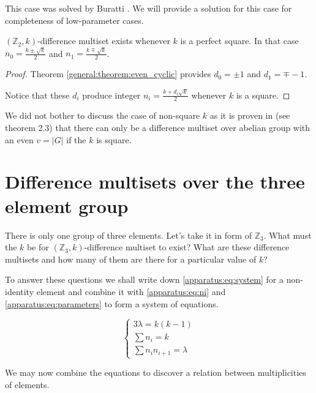     This case was solved by Buratti \cite{buratti1999old}. We will provide a solution for this case for completeness of low-parameter cases.
    
    \begin{theorem}
        $(\mathbb Z_2,k)$-difference multiset exists whenever $k$ is a perfect square. In that case $n_0 = \frac{k \pm \sqrt k}{2}$ and $n_1 = \frac{k \mp \sqrt k}{2}$.
    \end{theorem}
    \begin{proof}
        Theorem \ref{general:theorem:even_cyclic} provides $d_0 = \pm 1$ and $d_1 = \mp -1$.
        
        Notice that these $d_i$ produce integer $n_i = \frac{k + d_i \sqrt k}2$ whenever $k$ is a square.
    \end{proof}
    
    \begin{remark}
        We did not bother to discuss the case of non-square $k$ as it is proven in \cite{arasu2005cyclic} (see theorem 2.3) that there can only be a difference multiset over abelian group with an even $v=|G|$ if the $k$ is square.
    \end{remark}

\section{Difference multisets over the three element group}
There is only one group of three elements. Let's take it in form of $\mathbb Z_3$. What must the $k$ be for $(\mathbb Z_3,k)$-difference multiset to exist? What are these difference multisets and how many of them are there for a particular value of $k$?

To answer these questions we shall write down \eqref{apparatus:eq:system} for a non-identity element and combine it with \eqref{apparatus:eq:ni} and \eqref{apparatus:eq:parameters} to form a system of equations.

\begin{equation}
    \label{v3:eq:constraints}
    \begin{cases}
        3\lambda = k(k-1) \\
        \sum n_i = k \\
        \sum n_i n_{i+1} = \lambda
    \end{cases}
\end{equation}

We may now combine the equations to discover a relation between multiplicities of elements.

